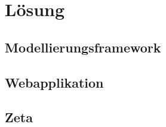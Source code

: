 \chapter{Lösung}
\label{sec:SOLUTION}

\section{Modellierungsframework}
\label{sec:SOLUTION_MODEL}

\section{Webapplikation}
\label{sec:SOLUTION_WEB}

\section{Zeta}
\label{sec:SOLUTION_ZETA}

